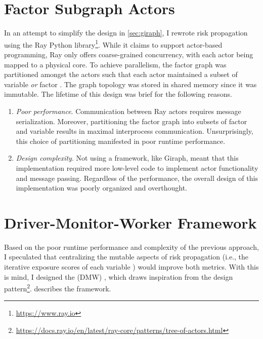 \section{Factor Subgraph Actors}\label{sec:subgraph-actors}

In an attempt to simplify the design in \cref{sec:giraph}, I rewrote risk propagation using the Ray Python library\footnote{\url{https://www.ray.io}}. While it claims to support actor-based programming, Ray only offers coarse-grained concurrency, with each actor being mapped to a physical core. To achieve parallelism, the factor graph was partitioned amongst the actors such that each actor maintained a subset of variable \verticesName \emph{or} factor \verticesName. The graph topology was stored in shared memory since it was immutable. The lifetime of this design was brief for the following reasons.
  \begin{enumerate}
    \item \emph{Poor performance}. Communication between Ray actors requires message serialization. Moreover, partitioning the factor graph into subsets of factor \verticesName and variable \verticesName results in maximal interprocess communication. Unsurprisingly, this choice of partitioning manifested in poor runtime performance.
    \item \emph{Design complexity}. Not using a framework, like Giraph, meant that this implementation required more low-level code to implement actor functionality and message passing. Regardless of the performance, the overall design of this implementation was poorly organized and overthought.
  \end{enumerate}

\section{Driver-Monitor-Worker Framework}\label{sec:dmw-framework}

Based on the poor runtime performance and complexity of the previous approach, I speculated that centralizing the mutable aspects of risk propagation (i.e., the iterative exposure scores of each variable \vertexName) would improve both metrics. With this is mind, I designed the  (DMW) , which draws inspiration from the  design pattern\footnote{\url{https://docs.ray.io/en/latest/ray-core/patterns/tree-of-actors.html}}.  describes the framework.

